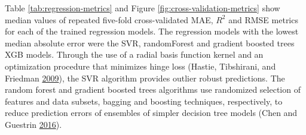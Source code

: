 \documentclass[english,msc,numbers]{coppe}
\begin{document}
  Table \ref{tab:regression-metrics} and Figure \ref{fig:cross-validation-metrics} show median values of repeated five-fold cross-validated MAE, \(R^2\) and RMSE metrics for each of the trained regression models. The regression models with the lowest median absolute error were the SVR, randomForest and gradient boosted trees XGB models. Through the use of a radial basis function kernel and an optimization procedure that minimizes hinge loss (Hastie, Tibshirani, and Friedman \protect\hyperlink{ref-Hastie2009}{2009}), the SVR algorithm provides outlier robust predictions. The random forest and gradient boosted trees algorithms use randomized selection of features and data subsets, bagging and boosting techniques, respectively, to reduce prediction errors of ensembles of simpler decision tree models (Chen and Guestrin \protect\hyperlink{ref-Chen2016}{2016}).
\end{document}

